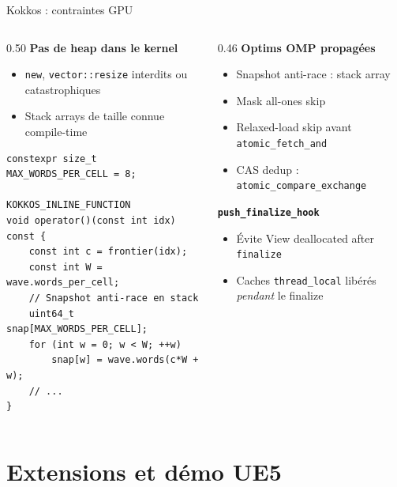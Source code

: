 \documentclass[aspectratio=169,11pt]{beamer}
\begin{document}
\begin{frame}[fragile]{Kokkos : contraintes GPU}
\begin{columns}[T]
\begin{column}{0.50\textwidth}
\textbf{Pas de heap dans le kernel}
\begin{itemize}
\footnotesize
    \item \texttt{new}, \texttt{vector::resize} interdits ou catastrophiques
    \item Stack arrays de taille connue compile-time
\end{itemize}

\begin{lstlisting}
constexpr size_t MAX_WORDS_PER_CELL = 8;

KOKKOS_INLINE_FUNCTION
void operator()(const int idx) const {
    const int c = frontier(idx);
    const int W = wave.words_per_cell;
    // Snapshot anti-race en stack
    uint64_t snap[MAX_WORDS_PER_CELL];
    for (int w = 0; w < W; ++w)
        snap[w] = wave.words(c*W + w);
    // ...
}
\end{lstlisting}
\end{column}
\begin{column}{0.46\textwidth}
\textbf{Optims OMP propagées}
\begin{itemize}
\footnotesize
    \item Snapshot anti-race : stack array
    \item Mask all-ones skip
    \item Relaxed-load skip avant \texttt{atomic\_fetch\_and}
    \item CAS dedup : \texttt{atomic\_compare\_exchange}
\end{itemize}

\vspace{0.15cm}
\textbf{\texttt{push\_finalize\_hook}}
\begin{itemize}
\footnotesize
    \item Évite View deallocated after \texttt{finalize}
    \item Caches \texttt{thread\_local} libérés \emph{pendant} le finalize
\end{itemize}
\end{column}
\end{columns}
\end{frame}

\section{Extensions et démo UE5}
\end{document}
